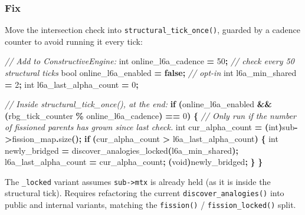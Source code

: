 \documentclass[
  11pt,
  a4paper,
]{article}
\newenvironment{Shaded}{\begin{snugshade}}{\end{snugshade}}
\newcommand{\CommentTok}[1]{\textcolor[rgb]{0.56,0.35,0.01}{\textit{#1}}}
\newcommand{\ControlFlowTok}[1]{\textcolor[rgb]{0.13,0.29,0.53}{\textbf{#1}}}
\newcommand{\DataTypeTok}[1]{\textcolor[rgb]{0.13,0.29,0.53}{#1}}
\newcommand{\DecValTok}[1]{\textcolor[rgb]{0.00,0.00,0.81}{#1}}
\newcommand{\KeywordTok}[1]{\textcolor[rgb]{0.13,0.29,0.53}{\textbf{#1}}}
\newcommand{\NormalTok}[1]{#1}
\newcommand{\OperatorTok}[1]{\textcolor[rgb]{0.81,0.36,0.00}{\textbf{#1}}}
\begin{document}
\subsubsection{Fix}\label{fix-1}

Move the intersection check into \texttt{structural\_tick\_once()},
guarded by a cadence counter to avoid running it every tick:

\begin{Shaded}
\begin{Highlighting}[]
\CommentTok{// Add to ConstructiveEngine:}
\DataTypeTok{int}\NormalTok{   online\_l6a\_cadence     }\OperatorTok{=} \DecValTok{50}\OperatorTok{;}    \CommentTok{// check every 50 structural ticks}
\DataTypeTok{bool}\NormalTok{  online\_l6a\_enabled     }\OperatorTok{=} \KeywordTok{false}\OperatorTok{;} \CommentTok{// opt{-}in}
\DataTypeTok{int}\NormalTok{   l6a\_min\_shared         }\OperatorTok{=} \DecValTok{2}\OperatorTok{;}
\DataTypeTok{int}\NormalTok{   l6a\_last\_alpha\_count   }\OperatorTok{=} \DecValTok{0}\OperatorTok{;}

\CommentTok{// Inside structural\_tick\_once(), at the end:}
\ControlFlowTok{if} \OperatorTok{(}\NormalTok{online\_l6a\_enabled}
    \OperatorTok{\&\&} \OperatorTok{(}\NormalTok{rbg\_tick\_counter }\OperatorTok{\%}\NormalTok{ online\_l6a\_cadence}\OperatorTok{)} \OperatorTok{==} \DecValTok{0}\OperatorTok{)}
\OperatorTok{\{}
    \CommentTok{// Only run if the number of fissioned parents has grown since last check.}
    \DataTypeTok{int}\NormalTok{ cur\_alpha\_count }\OperatorTok{=} \OperatorTok{(}\DataTypeTok{int}\OperatorTok{)}\NormalTok{sub}\OperatorTok{{-}\textgreater{}}\NormalTok{fission\_map}\OperatorTok{.}\NormalTok{size}\OperatorTok{();}
    \ControlFlowTok{if} \OperatorTok{(}\NormalTok{cur\_alpha\_count }\OperatorTok{\textgreater{}}\NormalTok{ l6a\_last\_alpha\_count}\OperatorTok{)} \OperatorTok{\{}
        \DataTypeTok{int}\NormalTok{ newly\_bridged }\OperatorTok{=}\NormalTok{ discover\_analogies\_locked}\OperatorTok{(}\NormalTok{l6a\_min\_shared}\OperatorTok{);}
\NormalTok{        l6a\_last\_alpha\_count }\OperatorTok{=}\NormalTok{ cur\_alpha\_count}\OperatorTok{;}
        \OperatorTok{(}\DataTypeTok{void}\OperatorTok{)}\NormalTok{newly\_bridged}\OperatorTok{;}
    \OperatorTok{\}}
\OperatorTok{\}}
\end{Highlighting}
\end{Shaded}

The \texttt{\_locked} variant assumes \texttt{sub-\textgreater{}mtx} is
already held (as it is inside the structural tick). Requires refactoring
the current \texttt{discover\_analogies()} into public and internal
variants, matching the \texttt{fission()} / \texttt{fission\_locked()}
split.
\end{document}
